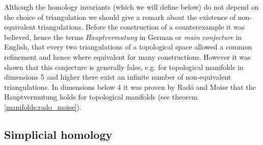 	\begin{remark}[Hauptvermutung]
		Although the homology invariants (which we will define below) do not depend on the choice of triangulation we should give a remark about the existence of non-equivalent triangulations. Before the construction of a counterexample it was believed, hence the terms \textit{Hauptvermutung} in German or \textit{main conjecture} in English, that every two triangulations of a topological space allowed a common refinement and hence where equivalent for many constructions. However it was shown that this conjecture is generally false, e.g. for topological manifolds in dimensions 5 and higher there exist an infinite number of non-equivalent triangulations. In dimensions below 4 it was proven by Rad\'o and Moise that the Hauptvermutung holds for topological manifolds (see theorem \ref{manifolds:rado_moise}).
	\end{remark}

\subsection{Simplicial homology}	
	
	

